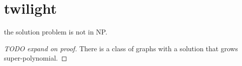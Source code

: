 \section{twilight}
\begin{theorem}
    the solution problem is not in NP.
\end{theorem}

\begin{proof}[TODO expand on proof]
    There is a class of graphs with a solution that grows super-polynomial.
\end{proof}